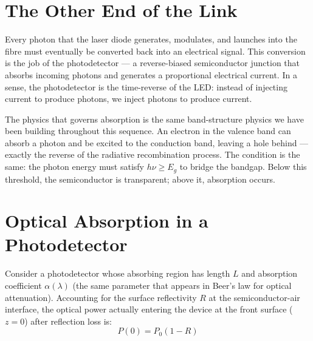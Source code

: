 
\section{The Other End of the Link}

Every photon that the laser diode generates, modulates, and launches into the fibre must eventually be converted back into an electrical signal. This conversion is the job of the photodetector — a reverse-biased semiconductor junction that absorbs incoming photons and generates a proportional electrical current. In a sense, the photodetector is the time-reverse of the LED: instead of injecting current to produce photons, we inject photons to produce current.

The physics that governs absorption is the same band-structure physics we have been building throughout this sequence. An electron in the valence band can absorb a photon and be excited to the conduction band, leaving a hole behind — exactly the reverse of the radiative recombination process. The condition is the same: the photon energy must satisfy $h\nu \geq E_g$ to bridge the bandgap. Below this threshold, the semiconductor is transparent; above it, absorption occurs.

\section{Optical Absorption in a Photodetector}

Consider a photodetector whose absorbing region has length $L$ and absorption coefficient $\alpha(\lambda)$ (the same parameter that appears in Beer's law for optical attenuation). Accounting for the surface reflectivity $R$ at the semiconductor-air interface, the optical power actually entering the device at the front surface ($z = 0$) after reflection loss is:
\begin{equation*}
    P(0) = P_0(1 - R)
\end{equation*}

